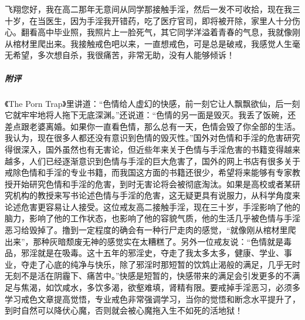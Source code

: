 \begin{case}
    飞翔您好，我在高二那年无意间从同学那接触手淫，然后一发不可收拾，现在我三十岁，在当医生，因为手淫我开错药，吃了医疗官司，即将被开除，家里人十分伤心。翻看高中毕业照，我照片上一脸死气，其它同学洋溢着青春的气息，我就像刚从棺材里爬出来。我接触戒色吧以来，一直想戒色，可是总是破戒，我感觉人生毫无希望，多次想自杀，我很痛苦，非常无助，没有人能够倾诉！
    \subparagraph{附评} 《The Porn Trap》里讲道：“色情给人虚幻的快感，前一刻它让人飘飘欲仙，后一刻它就牢牢地将人拖下无底深渊。”还说道：“色情的另一面是毁灭。我丢了饭碗，还差点跟老婆离婚。如果你一直看色情，那么总有一天，色情会毁了你全部的生活。我认为，现在很多人都还没有意识到色情的毁灭性。”国外对色情和手淫的危害研究得很深入，国外虽然也有无害论，但近些年来关于色情与手淫危害的书籍变得越来越多，人们已经逐渐意识到色情与手淫的巨大危害了，国外的网上书店有很多关于戒除色情和手淫的专业书籍，而我国这方面的书籍还很少，希望将来能够有专家教授开始研究色情和手淫的危害，到时无害论将会被彻底淘汰。如果是高校或者某研究机构的教授来写书论述色情与手淫的危害，这无疑更具有说服力，从科学角度来论述危害更容易让人接受。这位戒友高二接触手淫，现在三十岁，手淫影响了他的脑力，影响了他的工作状态，也影响了他的容貌气质，他的生活几乎被色情与手淫恶习给毁掉了。撸到一定程度的确会有一种行尸走肉的感觉，“就像刚从棺材里爬出来”，那种灰暗颓废无神的感觉实在太糟糕了。另外一位戒友说：“色情就是毒品，邪淫就是在吸毒。这十五年的邪淫史，夺走了我太多太多，健康、学业、事业，夺走了心底的纯净与快乐，除了邪淫时那短暂的饮鸩止渴般的满足，几乎无时无刻不是活在阴霾下、痛苦中。”快感是短暂的，快感带来的满足会引发更多的不满足与焦渴，如饮咸水，多饮多渴，欲壑难填，肾精有限。要戒掉手淫恶习，必须多学习戒色文章提高觉悟，专业戒色非常强调学习，当你的觉悟和断念水平提升了，到时自然可以降伏心魔，否则就会被心魔拖入生不如死的活地狱！
\end{case}

